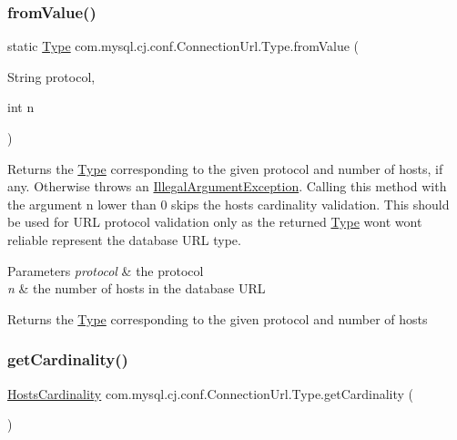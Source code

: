 \subsubsection{\texorpdfstring{from\+Value()}{fromValue()}}
{\footnotesize\ttfamily static \mbox{\hyperlink{enumcom_1_1mysql_1_1cj_1_1conf_1_1_connection_url_1_1_type}{Type}} com.\+mysql.\+cj.\+conf.\+Connection\+Url.\+Type.\+from\+Value (\begin{DoxyParamCaption}\item[{String}]{protocol,  }\item[{int}]{n }\end{DoxyParamCaption})\hspace{0.3cm}{\ttfamily [static]}}

Returns the \mbox{\hyperlink{enumcom_1_1mysql_1_1cj_1_1conf_1_1_connection_url_1_1_type}{Type}} corresponding to the given protocol and number of hosts, if any. Otherwise throws an \mbox{\hyperlink{}{Illegal\+Argument\+Exception}}. Calling this method with the argument n lower than 0 skips the hosts cardinality validation. This should be used for U\+RL protocol validation only as the returned \mbox{\hyperlink{enumcom_1_1mysql_1_1cj_1_1conf_1_1_connection_url_1_1_type}{Type}} won\textquotesingle{}t won\textquotesingle{}t reliable represent the database U\+RL type.


\begin{DoxyParams}{Parameters}
{\em protocol} & the protocol \\
\hline
{\em n} & the number of hosts in the database U\+RL \\
\hline
\end{DoxyParams}
\begin{DoxyReturn}{Returns}
the \mbox{\hyperlink{enumcom_1_1mysql_1_1cj_1_1conf_1_1_connection_url_1_1_type}{Type}} corresponding to the given protocol and number of hosts 
\end{DoxyReturn}
\mbox{\label{enumcom_1_1mysql_1_1cj_1_1conf_1_1_connection_url_1_1_type_a7135c7774bf78b325526f17ad12b49fb}} 
\subsubsection{\texorpdfstring{get\+Cardinality()}{getCardinality()}}
{\footnotesize\ttfamily \mbox{\hyperlink{enumcom_1_1mysql_1_1cj_1_1conf_1_1_connection_url_1_1_hosts_cardinality}{Hosts\+Cardinality}} com.\+mysql.\+cj.\+conf.\+Connection\+Url.\+Type.\+get\+Cardinality (\begin{DoxyParamCaption}{ }\end{DoxyParamCaption})}

